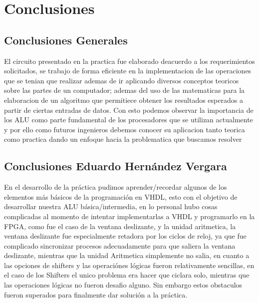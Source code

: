 \section{Conclusiones}
	\subsection{Conclusiones Generales}
	El circuito presentado en la practica fue elaborado deacuerdo a los requerimientos solicitados, se trabajo de forma eficiente en la implementacion de las operaciones que se tenian que realizar ademas de ir aplicando diversos conceptos teoricos sobre las partes de un computador; ademas del uso de las matematicas para la elaboracion de un algoritmo que permitiece obtener los resultados esperados a partir de ciertas entradas de datos. Con esto podemos observar la importancia de los ALU como parte fundamental de los procesadores que se utilizan actualmente y por ello como futuros ingenieros debemos conocer su aplicacion tanto teorica como practica dando un enfoque hacia la problematica que buscamos resolver
	\subsection{Conclusiones Eduardo Hern\'andez Vergara}
		En el desarrollo de la pr\'actica pudimos aprender/recordar algunos de los elementos m\'as b\'asicos de la programaci\'on en VHDL, esto con el objetivo de desarrollar nuestra ALU b\'asica/intermedia, en lo personal hubo cosas complicadas al momento de intentar implementarlas a VHDL y programarlo en la FPGA, como fue el caso de la ventana deslizante, y la unidad aritmetica, la ventana deslizante fue especialmente retadora por los ciclos de reloj, ya que fue complicado sincronizar procesos adecuadamente para que saliera la ventana deslizante, mientras que la unidad Aritmetica simplemente no salia, en cuanto a las opciones de shifters y las operaci\'ones l\'ogicas fueron relativamente sencillas, en el caso de los Shifters el unico problema era hacer que ciclara solo, mientras que las operaciones l\'ogicas no fueron desafio alguno. Sin embargo estos obstaculos fueron superados para finalmente dar soluci\'on a la pr\'actica.
